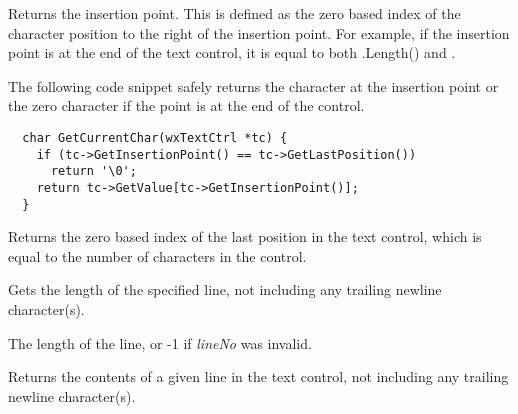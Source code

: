 
Returns the insertion point. This is defined as the zero based index of the
character position to the right of the insertion point. For example, if
the insertion point is at the end of the text control, it is equal to
both .Length() and 
. 

The following code snippet safely returns the character at the insertion
point or the zero character if the point is at the end of the control.

{\small%
\begin{verbatim}
  char GetCurrentChar(wxTextCtrl *tc) {
    if (tc->GetInsertionPoint() == tc->GetLastPosition())
      return '\0';
    return tc->GetValue[tc->GetInsertionPoint()];
  }	
\end{verbatim}
}%

\label{wxtextctrlgetlastposition}


Returns the zero based index of the last position in the text control, 
which is equal to the number of characters in the control.

\label{wxtextctrlgetlinelength}


Gets the length of the specified line, not including any trailing newline 
character(s).




The length of the line, or -1 if {\it lineNo} was invalid.

\label{wxtextctrlgetlinetext}


Returns the contents of a given line in the text control, not including
any trailing newline character(s).




